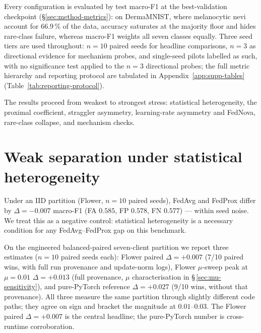 \documentclass[11pt,a4paper]{report}
\begin{document}

Every configuration is evaluated by test macro-F1 at the best-validation checkpoint
(\S\ref{sec:method-metrics}): on DermaMNIST, where melanocytic nevi account for
$66.9\,\%$ of the data, accuracy saturates at the
majority floor and hides rare-class failure, whereas macro-F1 weights all seven
classes equally. Three seed tiers are used throughout: $n=10$ paired seeds for
headline comparisons, $n=3$ as directional evidence for mechanism probes, and
single-seed pilots labelled as such, with no significance test applied to the
$n=3$ directional probes; the full metric hierarchy and reporting protocol are
tabulated in Appendix~\ref{app:supp-tables} (Table~\ref{tab:reporting-protocol}).

The results proceed from weakest to strongest stress: statistical heterogeneity,
the proximal coefficient, straggler asymmetry, learning-rate asymmetry and FedNova,
rare-class collapse, and mechanism checks.




\section{Weak separation under statistical heterogeneity}
\label{sec:statistical-heterogeneity}

Under an IID partition (Flower, $n=10$ paired seeds), FedAvg and FedProx
differ by $\Delta = -0.007$ macro-F1 (FA $0.585$, FP $0.578$, FN $0.577$) ---
within seed noise. We treat this as a negative control: statistical
heterogeneity is a necessary condition for any FedAvg--FedProx gap on this
benchmark.

On the engineered balanced-paired seven-client partition we report three
estimates ($n=10$ paired seeds each): Flower paired $\Delta = +0.007$ (7/10
paired wins, with full run provenance and update-norm logs), Flower $\mu$-sweep
peak at $\mu = 0.01$ $\Delta = +0.013$ (full provenance, $\mu$ characterisation
in \S\,\ref{sec:mu-sensitivity}), and pure-PyTorch reference $\Delta = +0.027$
(9/10 wins, without that provenance). All three measure the same partition through
slightly different code paths; they agree on sign and bracket the magnitude
at $0.01$--$0.03$. The Flower paired $\Delta = +0.007$ is the central
headline; the pure-PyTorch number is cross-runtime corroboration.
\end{document}

